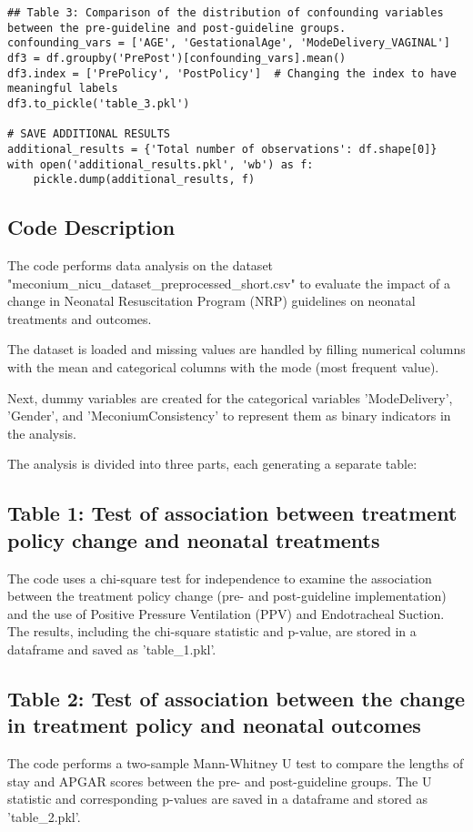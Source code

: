 \documentclass[11pt]{article}
\begin{document}
\begin{verbatim}
## Table 3: Comparison of the distribution of confounding variables between the pre-guideline and post-guideline groups.
confounding_vars = ['AGE', 'GestationalAge', 'ModeDelivery_VAGINAL']
df3 = df.groupby('PrePost')[confounding_vars].mean()
df3.index = ['PrePolicy', 'PostPolicy']  # Changing the index to have meaningful labels
df3.to_pickle('table_3.pkl')

# SAVE ADDITIONAL RESULTS
additional_results = {'Total number of observations': df.shape[0]}
with open('additional_results.pkl', 'wb') as f:
    pickle.dump(additional_results, f)

\end{verbatim}

\subsection{Code Description}

The code performs data analysis on the dataset "meconium\_nicu\_dataset\_preprocessed\_short.csv" to evaluate the impact of a change in Neonatal Resuscitation Program (NRP) guidelines on neonatal treatments and outcomes.

The dataset is loaded and missing values are handled by filling numerical columns with the mean and categorical columns with the mode (most frequent value). 

Next, dummy variables are created for the categorical variables 'ModeDelivery', 'Gender', and 'MeconiumConsistency' to represent them as binary indicators in the analysis.

The analysis is divided into three parts, each generating a separate table:

\subsection{Table 1: Test of association between treatment policy change and neonatal treatments}
The code uses a chi-square test for independence to examine the association between the treatment policy change (pre- and post-guideline implementation) and the use of Positive Pressure Ventilation (PPV) and Endotracheal Suction. The results, including the chi-square statistic and p-value, are stored in a dataframe and saved as 'table\_1.pkl'.

\subsection{Table 2: Test of association between the change in treatment policy and neonatal outcomes}
The code performs a two-sample Mann-Whitney U test to compare the lengths of stay and APGAR scores between the pre- and post-guideline groups. The U statistic and corresponding p-values are saved in a dataframe and stored as 'table\_2.pkl'.
\end{document}
